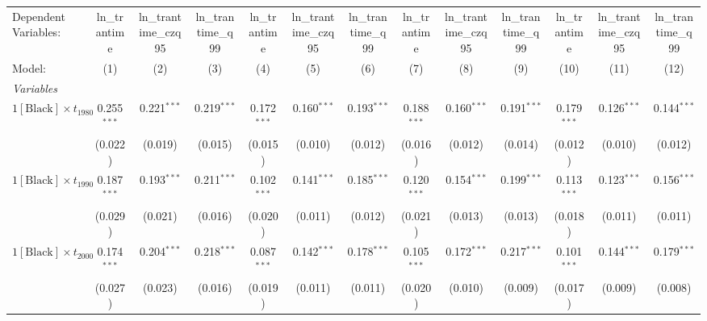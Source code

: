 
\begingroup
\centering
\begin{tabular}{lcccccccccccc}
   \tabularnewline \midrule \midrule
   Dependent Variables:                    & ln\_trantime  & ln\_trantime\_czq95   & ln\_trantime\_q99   & ln\_trantime  & ln\_trantime\_czq95   & ln\_trantime\_q99   & ln\_trantime  & ln\_trantime\_czq95   & ln\_trantime\_q99   & ln\_trantime  & ln\_trantime\_czq95   & ln\_trantime\_q99\\    
   Model:                                  & (1)           & (2)                   & (3)                 & (4)           & (5)                   & (6)                 & (7)           & (8)                   & (9)                 & (10)          & (11)                  & (12)\\  
   \midrule
   \emph{Variables}\\
   $1[\text{Black}] \times t_{1980}$       & 0.255$^{***}$ & 0.221$^{***}$         & 0.219$^{***}$       & 0.172$^{***}$ & 0.160$^{***}$         & 0.193$^{***}$       & 0.188$^{***}$ & 0.160$^{***}$         & 0.191$^{***}$       & 0.179$^{***}$ & 0.126$^{***}$         & 0.144$^{***}$\\   
                                           & (0.022)       & (0.019)               & (0.015)             & (0.015)       & (0.010)               & (0.012)             & (0.016)       & (0.012)               & (0.014)             & (0.012)       & (0.010)               & (0.012)\\   
   $1[\text{Black}] \times t_{1990}$       & 0.187$^{***}$ & 0.193$^{***}$         & 0.211$^{***}$       & 0.102$^{***}$ & 0.141$^{***}$         & 0.185$^{***}$       & 0.120$^{***}$ & 0.154$^{***}$         & 0.199$^{***}$       & 0.113$^{***}$ & 0.123$^{***}$         & 0.156$^{***}$\\   
                                           & (0.029)       & (0.021)               & (0.016)             & (0.020)       & (0.011)               & (0.012)             & (0.021)       & (0.013)               & (0.013)             & (0.018)       & (0.011)               & (0.011)\\   
   $1[\text{Black}] \times t_{2000}$       & 0.174$^{***}$ & 0.204$^{***}$         & 0.218$^{***}$       & 0.087$^{***}$ & 0.142$^{***}$         & 0.178$^{***}$       & 0.105$^{***}$ & 0.172$^{***}$         & 0.217$^{***}$       & 0.101$^{***}$ & 0.144$^{***}$         & 0.179$^{***}$\\   
                                           & (0.027)       & (0.023)               & (0.016)             & (0.019)       & (0.011)               & (0.011)             & (0.020)       & (0.010)               & (0.009)             & (0.017)       & (0.009)               & (0.008)\\   

\end{tabular}
